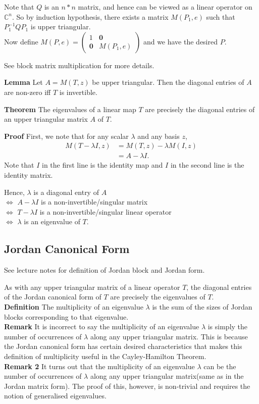 \documentclass{article}
\begin{document}
Note that $Q$ is an $n*n$ matrix, and hence can be viewed as a linear operator on $\mathbb{C}^n$. So by induction hypothesis, there exists a matrix $M(P_1,e)$ such that $P_1^{-1}QP_1$ is upper triangular.\\
Now define $M(P,e)=\begin{pmatrix}
	1 & \mathbf{0}\\
	\mathbf{0} & M(P_1, e)
\end{pmatrix} 
$ and we have the desired $P$.

See block matrix multiplication for more details.

\textbf{Lemma} Let $A = M(T,z)$ be upper triangular. Then the diagonal entries of $A$ are non-zero iff $T$ is invertible.

\textbf{Theorem} The eigenvalues of a linear map $T$ are precisely the diagonal entries of an upper triangular matrix $A$ of $T$. 

\textbf{Proof}
First, we note that for any scalar $\lambda$ and any basis $z$, 
\begin{align*}
	M(T-\lambda I, z)&=M(T,z)-\lambda M(I,z)\\
	&=A-\lambda I.
\end{align*}
Note that $I$ in the first line is the identity map and $I$ in the second line is the identity matrix. 
 
Hence, $\lambda$ is a diagonal entry of $A$ \\
$\iff$ $A-\lambda I$ is a non-invertible/singular matrix \\
$\iff$ $T-\lambda I$ is a non-invertible/singular linear operator\\
$\iff$ $\lambda$ is an eigenvalue of $T$.


\subsection{Jordan Canonical Form}
See lecture notes for definition of Jordan block and Jordan form.

As with any upper triangular matrix of a linear operator $T$, the diagonal entries of the Jordan canonical form of $T$ are precisely the eigenvalues of $T$.\\
\textbf{Definition} The multiplicity of an eigenvalue $\lambda$ is the sum of the sizes of Jordan blocks corresponding to that eigenvalue.\\
\textbf{Remark} It is incorrect to say the multiplicity of an eigenvalue $\lambda$ is simply the number of occurrences of $\lambda$ along any upper triangular matrix. This is because the Jordan canonical form has certain desired characteristics that makes this definition of multiplicity useful in the Cayley-Hamilton Theorem.\\
\textbf{Remark 2} It turns out that the multiplicity of an eigenvalue $\lambda$ can be the number of occurrences of $\lambda$ along any upper triangular matrix(same as in the Jordan matrix form). The proof of this, however, is non-trivial and requires the notion of generalised eigenvalues. 
\end{document}
